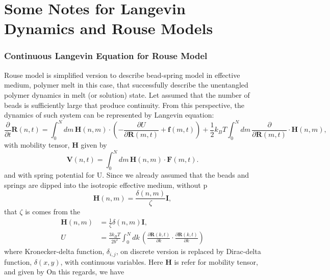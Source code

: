 \documentclass[10pt, a4paper]{article}
\begin{document}
\part{Some Notes for Langevin Dynamics and Rouse Models}
\section{Continuous Langevin Equation for Rouse Model}
Rouse model is simplified version to describe bead-spring model in effective medium, polymer melt in this case, that successfully describe the unentangled polymer dynamics in melt (or solution) state. Let assumed that the number of beads is sufficiently large that produce continuity.  From this perspective, the dynamics of such system can be represented by Langevin equation:
\begin{equation}
\frac{\partial}{\partial t}\mathbf{R}(n, t) = \int_{0}^{N}dm\, \mathbf{H}(n, m)\cdot\left(-\frac{\partial U}{\partial \mathbf{R}(m, t)} + \mathbf{f}(m, t)\right) + \frac{1}{2}k_BT\int_{0}^{N}dm\,\frac{\partial}{\partial \mathbf{R}(m, t)}\cdot\mathbf{H}(n, m),
\label{eq:Langevin_basic_continuous}
\end{equation}
with mobility tensor, $\mathbf{H}$ given by
\begin{equation}
\mathbf{V}(n,t) = \int_0^N dm\,\mathbf{H}(n,m)\cdot\mathbf{F}(m,t).
\end{equation}
and with spring potential for U. 
Since we already assumed that the beads and springs are dipped into the isotropic effective medium, without p
\begin{equation}
\mathbf{H}(n,m) = \frac{\delta(n,m)}{\zeta}\mathbf{I},
\end{equation}
that $\zeta$ is comes from the 
\begin{align}
\mathbf{H}(n,m) &= \frac{1}{\zeta}\delta(n,m)\mathbf{I}, \\
U &= \frac{3k_BT}{2b^2}\int_{0}^{N}dk\,\left(\frac{\partial \mathbf{R}(k, t)}{\partial k}\cdot\frac{\partial \mathbf{R}(k, t)}{\partial k}\right)
\end{align}
where Kronecker-delta function, $\delta_{i,j}$, on discrete version is replaced by Dirac-delta function, $\delta(x, y)$, with continuous variables.
Here $\mathbf{H}$ is refer for mobility tensor, and given by
On this regards, we have
\end{document}
